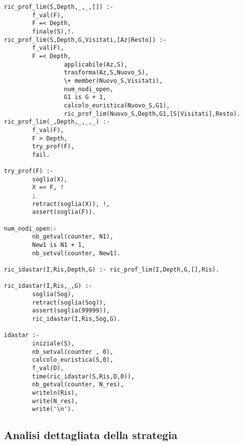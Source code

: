 \begin{lstlisting}
ric_prof_lim(S,Depth,_,_,[]) :-
        f_val(F),
        F =< Depth,
        finale(S),!.
ric_prof_lim(S,Depth,G,Visitati,[Az|Resto]) :-
        f_val(F),
        F =< Depth,
                 applicabile(Az,S),
                 trasforma(Az,S,Nuovo_S),
                 \+ member(Nuovo_S,Visitati),
                 num_nodi_open,
                 G1 is G + 1,
                 calcolo_euristica(Nuovo_S,G1),
                 ric_prof_lim(Nuovo_S,Depth,G1,[S|Visitati],Resto).
ric_prof_lim(_,Depth,_,_,_) :-
        f_val(F),
        F > Depth,
        try_prof(F),
        fail.

try_prof(F) :-
        soglia(X),
        X =< F, !
        ;
        retract(soglia(X)), !,
        assert(soglia(F)).

num_nodi_open:-
        nb_getval(counter, N1),
        New1 is N1 + 1,
        nb_setval(counter, New1).

ric_idastar(I,Ris,Depth,G) :- ric_prof_lim(I,Depth,G,[],Ris).

ric_idastar(I,Ris,_,G) :-
        soglia(Sog),
        retract(soglia(Sog)),
        assert(soglia(99999)),
        ric_idastar(I,Ris,Sog,G).

idastar :-
        iniziale(S),
        nb_setval(counter , 0),
        calcolo_euristica(S,0),
        f_val(D),
        time(ric_idastar(S,Ris,D,0)),
        nb_getval(counter, N_res),
        writeln(Ris),
        write(N_res),
        write('\n').
\end{lstlisting}

\subsection{Analisi dettagliata della strategia}

